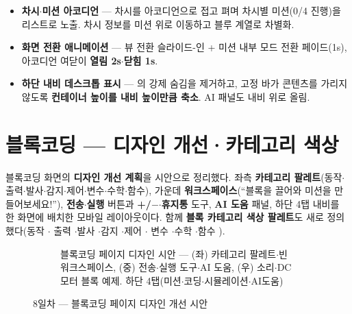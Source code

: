 \smallskip
{}

\begin{itemize}
  \item \textbf{차시$\cdot$미션 아코디언} — 차시를 아코디언으로 접고 펴며 차시별 미션(0/4 진행)을
  리스트로 노출. 차시 정보를 미션 위로 이동하고 블루 계열로 차별화.
  \item \textbf{화면 전환 애니메이션} — 뷰 전환 슬라이드-인 + 미션 내부 모드 전환 페이드(1s),
  아코디언 여닫이 \textbf{열림 2s$\cdot$닫힘 1s}.
  \item \textbf{하단 내비 데스크톱 표시} — 의 강제 숨김을 제거하고,
  고정 바가 콘텐츠를 가리지 않도록 \textbf{컨테이너 높이를 내비 높이만큼 축소}. AI 패널도 내비 위로 올림.
\end{itemize}

\section{블록코딩 — 디자인 개선·카테고리 색상}
블록코딩 화면의 \textbf{디자인 개선 계획}을 시안으로 정리했다. 좌측 \textbf{카테고리
팔레트}(동작$\cdot$출력$\cdot$발사$\cdot$감지$\cdot$제어$\cdot$변수$\cdot$수학$\cdot$함수), 가운데
\textbf{워크스페이스}(``블록을 끌어와 미션을 만들어보세요!''), \textbf{전송$\cdot$실행} 버튼과
\textbf{+/$-$$\cdot$휴지통} 도구, \textbf{AI 도움} 패널, 하단 4탭 내비를 한 화면에 배치한 모바일
레이아웃이다. 함께 \textbf{블록 카테고리 색상 팔레트}도 새로 정의했다(동작 $\cdot$%
출력 $\cdot$발사 $\cdot$감지 $\cdot$제어 $\cdot$%
변수 $\cdot$수학 $\cdot$함수 ).

\smallskip
\noindent{}   %
 

\begin{figure}[htbp]\centering
  \begin{subfigure}{0.82\linewidth}\centering
    \caption{블록코딩 페이지 디자인 시안 — (좌) 카테고리 팔레트$\cdot$빈 워크스페이스, (중) 전송$\cdot$실행 도구$\cdot$AI 도움, (우) 소리$\cdot$DC 모터 블록 예제. 하단 4탭(미션$\cdot$코딩$\cdot$시뮬레이션$\cdot$AI도움)}
  \end{subfigure}
  \caption{8일차 — 블록코딩 페이지 디자인 개선 시안}
\end{figure}

